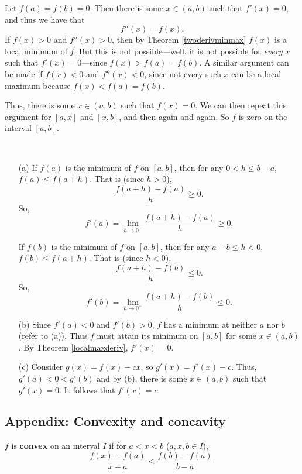 \begin{problem}[11-41]
Let $f(a) = f(b) = 0$. Then there is some $x \in (a, b)$ such that $f'(x) = 0$, and thus we have that 
\[ f''(x) = f(x). \]
If $f(x) > 0$ and $f''(x) > 0$, then by Theorem \ref{twoderivminmax} $f(x)$ is a local minimum of $f$. But this is not possible---well, it is not possible for \textit{every} $x$ such that $f'(x) = 0$---since $f(x) > f(a) = f(b)$. A similar argument can be made if $f(x) < 0$ and $f''(x) < 0$, since not every such $x$ can be a local maximum because $f(x) < f(a) = f(b)$. 

Thus, there is some $x \in (a, b)$ such that $f(x) = 0$. We can then repeat this argument for $[a, x]$ and $[x, b]$, and then again and again. So $f$ is zero on the interval $[a, b]$. 
\end{problem}

\begin{problem}[11-54] \ 
\begin{enumerate}
\item[(a)] If $f(a)$ is the minimum of $f$ on $[a, b]$, then for any $0 < h \le b - a$, $f(a) \le f(a+h)$. That is (since $h > 0$),
\[ \frac{f(a+h)-f(a)}h \ge 0. \]
So, 
\[ f'(a) = \lim_{h \to 0^+} \frac{f(a+h)-f(a)}h \ge 0. \]

If $f(b)$ is the minimum of $f$ on $[a, b]$, then for any $a-b \le h < 0$, $f(b) \le f(a+h)$. That is (since $h < 0$),
\[ \frac{f(a+h)-f(b)}h \le 0. \]
So, 
\[ f'(b) = \lim_{h \to 0^-} \frac{f(a+h)-f(b)}h \le 0. \]

\item[(b)] Since $f'(a) < 0$ and $f'(b) > 0$, $f$ has a minimum at neither $a$ nor $b$ (refer to (a)). Thus $f$ must attain its minimum on $[a, b]$ for some $x \in (a, b)$. By Theorem \ref{localmaxderiv}, $f'(x) = 0$. 

\item[(c)] Consider $g(x) = f(x) - cx$, so $g'(x) = f'(x) - c$. Thus, $g'(a) < 0 < g'(b)$ and by (b), there is some $x \in (a, b)$ such that $g'(x) = 0$. It follows that $f'(x) = c$.
\end{enumerate}
\end{problem}

\subsection{Appendix: Convexity and concavity}

\begin{definition}
$f$ is \textbf{convex} on an interval $I$ if for $a < x < b$ ($a, x, b \in I$),
\[ \frac{f(x)-f(a)}{x-a} < \frac{f(b)-f(a)}{b-a}. \]
\end{definition}

